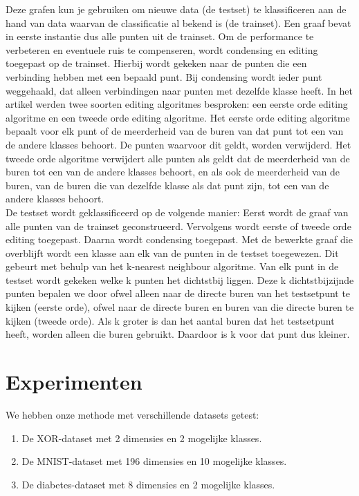 \documentclass{article}
\begin{document}
Deze grafen kun je gebruiken om nieuwe data (de testset) te klassificeren aan de hand van data waarvan de classificatie al bekend is (de trainset). Een graaf bevat in eerste instantie dus alle punten uit de trainset. Om de performance te verbeteren en eventuele ruis te compenseren, wordt condensing en editing toegepast op de trainset. Hierbij wordt gekeken naar de punten die een verbinding hebben met een bepaald punt. Bij condensing wordt ieder punt weggehaald, dat alleen verbindingen naar punten met dezelfde klasse heeft. 
In het artikel werden twee soorten editing algoritmes besproken: een eerste orde editing algoritme en een tweede orde editing algoritme. 
Het eerste orde editing algoritme bepaalt voor elk punt of de meerderheid van de buren van dat punt tot een van de andere klasses behoort. De punten waarvoor dit geldt, worden verwijderd. 
Het tweede orde algoritme verwijdert alle punten als geldt dat de meerderheid van de buren tot een van de andere klasses behoort, en als ook de meerderheid van de buren, van de buren die van dezelfde klasse als dat punt zijn, tot een van de andere klasses behoort.\\

De testset wordt geklassificeerd op de volgende manier: Eerst wordt de graaf van alle punten van de trainset geconstrueerd. Vervolgens wordt eerste of tweede orde editing toegepast. Daarna wordt condensing toegepast. Met de bewerkte graaf die overblijft wordt een klasse aan elk van de punten in de testset toegewezen. Dit gebeurt met behulp van het k-nearest neighbour algoritme. Van elk punt in de testset wordt gekeken welke k punten het dichtstbij liggen. Deze k dichtstbijzijnde punten bepalen we door ofwel alleen naar de directe buren van het testsetpunt te kijken (eerste orde), ofwel naar de directe buren en buren van die directe buren te kijken (tweede orde). Als k groter is dan het aantal buren dat het testsetpunt heeft, worden alleen die buren gebruikt. Daardoor is k voor dat punt dus kleiner.

\section{Experimenten}

We hebben onze methode met verschillende datasets getest:
\begin{enumerate}
\item De XOR-dataset met 2 dimensies en 2 mogelijke klasses.
\item De MNIST-dataset met 196 dimensies en 10 mogelijke klasses.
\item De diabetes-dataset met 8 dimensies en 2 mogelijke klasses.
\end{enumerate}
\end{document}
